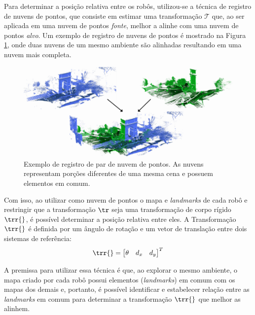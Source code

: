 Para determinar a posição relativa entre os robôs, utilizou-se a técnica 
de registro de nuvens de pontos, que consiste em estimar uma 
transformação $\mathcal{T}$ que, ao ser aplicada em uma nuvem de pontos 
\emph{fonte}, melhor a alinhe com uma nuvem de pontos \emph{alvo}. Um 
exemplo de registro de nuvens de pontos é mostrado na Figura 
\ref{fig:point-cloud-registration-example}, onde duas nuvens de um mesmo 
ambiente são alinhadas resultando em uma nuvem mais completa.

\begin{figure}[h]
  \centering
  \includegraphics[width=.7\textwidth]{figs/point-cloud-registration-example.png}
  \caption[Exemplo do registro de nuvem de pontos]{Exemplo de registro de par de nuvem de pontos. As nuvens representam porções diferentes de uma mesma cena e possuem elementos 
  em comum.}
  \label{fig:point-cloud-registration-example}
\end{figure}

Com isso, ao utilizar como nuvem de pontos o mapa 
e \textit{landmarks} de cada robô e restringir que a transformação $\tr$ seja uma transformação de corpo rígido $\trr{}$, é possível determinar 
a posição 
relativa entre eles. A Transformação $\trr{}$ é definida por um ângulo
de rotação e um vetor de translação entre dois sistemas de referência:
\begin{equation}
  \trr{} = \begin{bmatrix}
    \theta & d_x & d_y 
  \end{bmatrix}^T
  \label{eq:rigid-transform}
\end{equation}

A premissa para utilizar essa técnica é que, ao 
explorar o mesmo ambiente, o mapa criado por cada robô possui 
elementos (\textit{landmarks}) em comum com 
os mapas dos demais e, portanto, é possível identificar e estabelecer 
relação entre as \textit{landmarks} em comum para determinar a 
transformação $\trr{}$ que melhor as alinhem.

